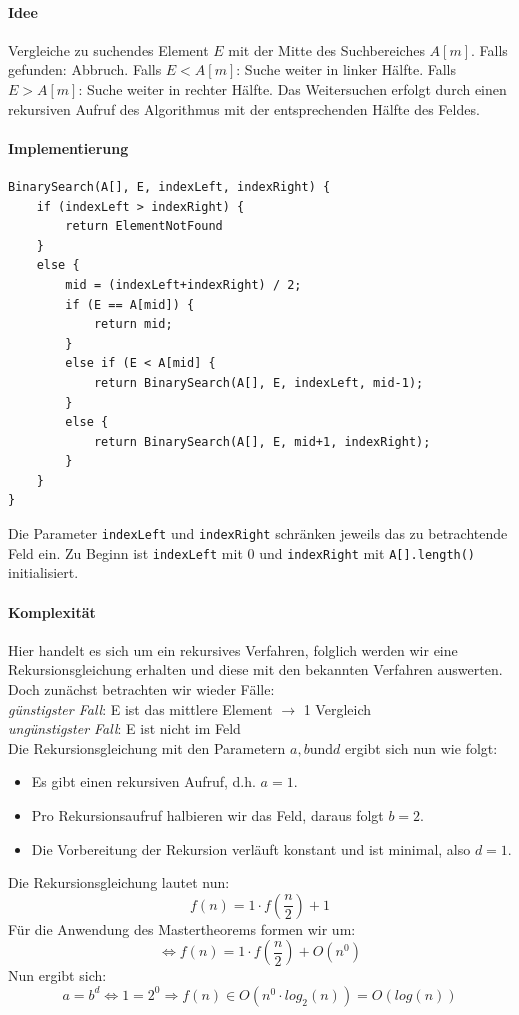 \documentclass[11pt,a4paper]{scrartcl}
\begin{document}
\paragraph{Idee} Vergleiche zu suchendes Element $E$ mit der Mitte des Suchbereiches $A[m]$. Falls gefunden: Abbruch. Falls $E < A[m]$: Suche weiter in linker Hälfte. Falls $E > A[m]$: Suche weiter in rechter Hälfte. Das Weitersuchen erfolgt durch einen rekursiven Aufruf des Algorithmus mit der entsprechenden Hälfte des Feldes.
\paragraph{Implementierung}
\begin{lstlisting}
BinarySearch(A[], E, indexLeft, indexRight) {
	if (indexLeft > indexRight) {
		return ElementNotFound	
	}
	else {
		mid = (indexLeft+indexRight) / 2;
		if (E == A[mid]) {
			return mid;		
		}
		else if (E < A[mid] {
			return BinarySearch(A[], E, indexLeft, mid-1);	
		}
		else {
			return BinarySearch(A[], E, mid+1, indexRight);	
		}
	}
}
\end{lstlisting} 
Die Parameter \texttt{indexLeft} und \texttt{indexRight} schränken jeweils das zu betrachtende Feld ein. Zu Beginn ist \texttt{indexLeft} mit $0$ und \texttt{indexRight} mit \texttt{A[].length()} initialisiert. 
\paragraph{Komplexität}
Hier handelt es sich um ein rekursives Verfahren, folglich werden wir eine Rekursionsgleichung erhalten und diese mit den bekannten Verfahren auswerten. Doch zunächst betrachten wir wieder Fälle: \\
\textit{günstigster Fall}: \quad E ist das mittlere Element $\to$ 1 Vergleich\\
\textit{ungünstigster Fall}: \quad E ist nicht im Feld \\
Die Rekursionsgleichung mit den Parametern $a, b \text{und} d$ ergibt sich nun wie folgt:
\begin{itemize}
\item Es gibt einen rekursiven Aufruf, d.h. $a = 1$.
\item Pro Rekursionsaufruf halbieren wir das Feld, daraus folgt $b = 2$.
\item Die Vorbereitung der Rekursion verläuft konstant und ist minimal, also $d = 1$.
\end{itemize}
Die Rekursionsgleichung lautet nun: 
\[f(n) = 1 \cdot f(\frac{n}{2}) + 1\]
Für die Anwendung des Mastertheorems formen wir um:
\[\iff f(n) = 1 \cdot f(\frac{n}{2}) + O(n^{0})\]
Nun ergibt sich: 
\[a = b^{d} \iff 1 = 2^{0} \Rightarrow f(n) \in O(n^{0} \cdot log_{2}(n)) = O(log(n))\]
\end{document}
